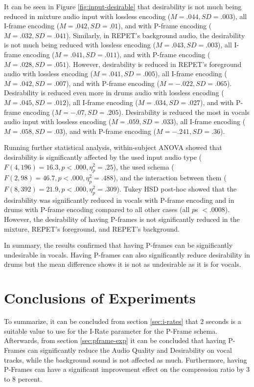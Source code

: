 It can be seen in Figure \ref{fig:input-desirable} that desirability is not much being reduced in mixture audio input with lossless encoding ($M=.044, SD=.003$), all I-frame encoding ($M=.042, SD=.01$), and with P-frame encoding ($M=.032, SD=.041$).
Similarly, in REPET's background audio, the desirability is not much being reduced with lossless encoding ($M=.043, SD=.003$), all I-frame encoding ($M=.041, SD=.011$), and with P-frame encoding ($M=.028, SD=.051$).
However, desirability is reduced in REPET's foreground audio with lossless encoding ($M=.041, SD=.005$), all I-frame encoding ($M=.042, SD=.007$), and with P-frame encoding ($M=-.022, SD=.065$).
Desirability is reduced even more in drums audio with lossless encoding ($M=.045, SD=.012$), all I-frame encoding ($M=.034, SD=.027$), and with P-frame encoding ($M=-.07, SD=.205$).
Desirability is reduced the most in vocals audio input with lossless encoding ($M=.059, SD=.033$), all I-frame encoding ($M=.058, SD=.03$), and with P-frame encoding ($M=-.241, SD=.36$).

Running further statistical analysis,  within-subject ANOVA showed that desirability is significantly affected by the used input audio type ($F(4,196)=16.3, p<.000, \eta_{p}^{2}=.25$), the used schema ($F(2,98)=46.7, p<.000, \eta_{p}^{2}=.488$), and the interaction between them ($F(8,392)=21.9, p<.000, \eta_{p}^{2}=.309$).
Tukey HSD post-hoc showed that the desirability was significantly reduced in vocals with P-frame encoding and in drums with P-frame encoding compared to all other cases (all $p$s $<.0008$). However, the desirability of having P-frames is not significantly reduced in the mixture, REPET's foreground, and REPET's background.

In summary, the results confirmed that having P-frames can be significantly undesirable in vocals. Having P-frames can also significantly reduce desirability in drums but the mean difference shows it is not as undesirable as it is for vocals.

\section{Conclusions of Experiments} 


To summarize, it can be concluded from section \ref{sec:i-rates} that 2 seconds is a suitable value to use for the I-Rate parameter for the P-Frame schema. Afterwards, from section \ref{sec:pframe-exp} it can be concluded that having P-Frames can significantly reduce the Audio Quality and Desirability on vocal tracks, while the background sound is not affected as much. Furthermore, having P-Frames can have a significant improvement effect on the compression ratio by 3 to 8 percent.
